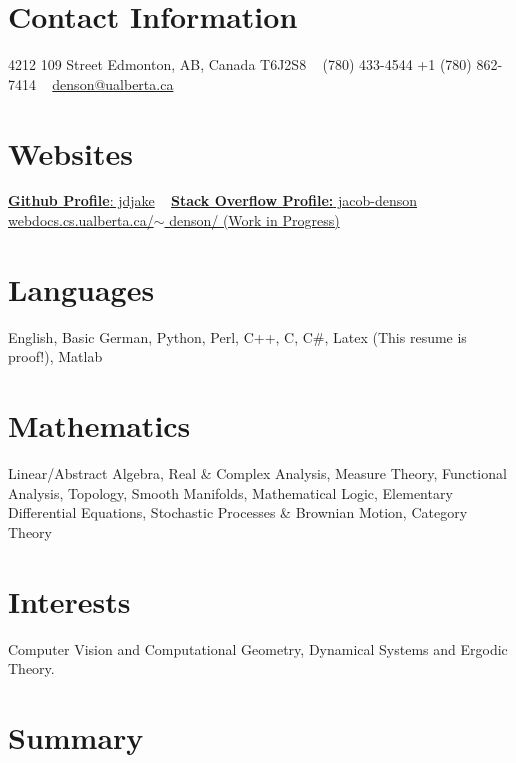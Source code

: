 \documentclass{friggeri-cv} %
\begin{document}


\begin{aside} %
\section{Contact Information}
4212 109 Street
Edmonton, AB, Canada
T6J2S8
~
(780) 433-4544
+1 (780) 862-7414
~
\href{mailto:denson@ualberta.ca}{denson@ualberta.ca}
\section{Websites}
\href{https://github.com/jdjake}{{\bf Github Profile}: jdjake}
~
\href{http://stackoverflow.com/users/2601483/jacob-denson}{{\bf Stack Overflow Profile:} jacob-denson}
~
\href{http://webdocs.cs.ualberta.ca/~denson/}{webdocs.cs.ualberta.ca/$\sim$ denson/ (Work in Progress)}
\section{Languages}
English, Basic German,
Python, Perl, C++, C, C\#, Latex (This resume is proof!), Matlab
\section{Mathematics}
Linear/Abstract Algebra, Real \& Complex Analysis, Measure Theory, Functional Analysis, Topology, Smooth Manifolds, Mathematical Logic, Elementary Differential Equations, Stochastic Processes \& Brownian Motion, Category Theory
\section{Interests}
Computer Vision and Computational Geometry, Dynamical Systems and Ergodic Theory.
\end{aside}


\section{Summary}
\end{document}
